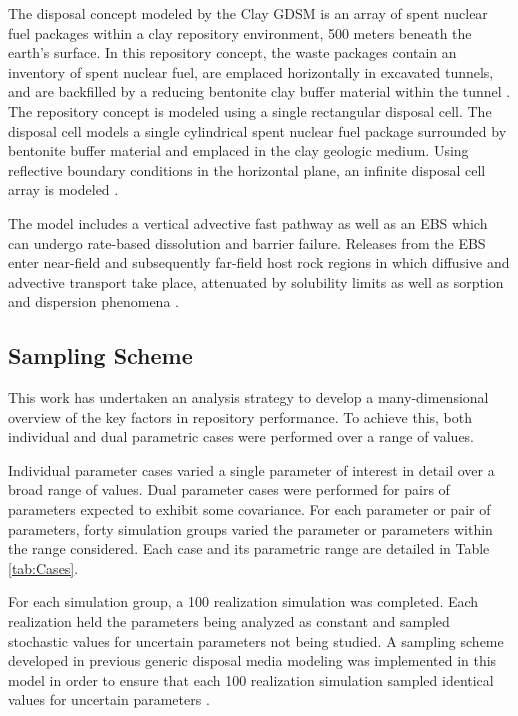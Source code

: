 The disposal concept modeled by the Clay \gls{GDSM} is an array of spent nuclear 
fuel packages within a clay repository environment, 500 meters beneath the 
earth's surface. In this repository concept, the waste packages contain an 
inventory of spent nuclear fuel, are emplaced horizontally in excavated tunnels, 
and are backfilled by a reducing bentonite clay buffer material within the 
tunnel \cite{nutt_generic_2009}.  The repository concept is modeled using a 
single rectangular disposal cell. The disposal cell models a single cylindrical 
spent nuclear fuel package surrounded by bentonite buffer material and emplaced 
in the clay geologic medium. Using reflective boundary conditions in the 
horizontal plane, an infinite disposal cell array is modeled 
\cite{nutt_generic_2009}.

The model includes a vertical advective fast pathway as well as an \gls{EBS} which 
can undergo rate-based dissolution and barrier failure.  Releases from the 
\gls{EBS} enter near-field and subsequently far-field host rock regions in which 
diffusive and advective transport take place, attenuated by solubility limits as 
well as sorption and dispersion phenomena \cite{clayton_generic_2011}.

\subsection{Sampling Scheme}

This work has undertaken an analysis strategy to develop a many-dimensional 
overview of the key factors in repository performance. To achieve this, 
both individual and dual parametric cases were performed over a range of 
values.

Individual parameter cases varied a single parameter of interest in 
detail over a broad range of values. Dual parameter cases were 
performed for pairs of parameters expected to exhibit some covariance. For 
each parameter or pair of parameters, forty simulation 
groups varied the parameter or parameters within the range considered. Each 
case and its parametric range are detailed in Table \ref{tab:Cases}. 



For each simulation group, a 100 realization simulation was completed. Each
realization held the parameters being analyzed as constant and sampled 
stochastic values for uncertain parameters not being studied.  A sampling scheme 
developed in previous generic disposal media modeling was implemented in this 
model in order to ensure that each 100 realization simulation sampled 
identical values for uncertain parameters \cite{clayton_generic_2011, 
nutt_generic_2009}.  


